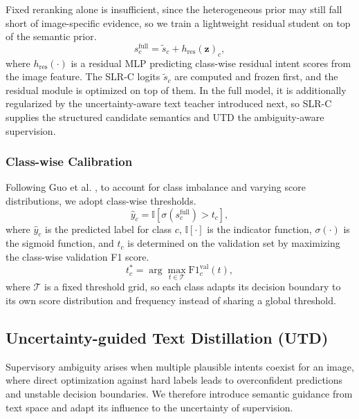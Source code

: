 Fixed reranking alone is insufficient, since the heterogeneous prior may still fall short of image-specific evidence, so we train a lightweight residual student on top of the semantic prior.
\begin{equation}
s^{\text{full}}_c = \tilde{s}_c + h_{\text{res}}(\mathbf{z})_c,
\end{equation}
where $h_{\text{res}}(\cdot)$ is a residual MLP predicting class-wise residual intent scores from the image feature. The SLR-C logits $\tilde{s}_c$ are computed and frozen first, and the residual module is optimized on top of them. In the full model, it is additionally regularized by the uncertainty-aware text teacher introduced next, so SLR-C supplies the structured candidate semantics and UTD the ambiguity-aware supervision.

\subsubsection{Class-wise Calibration}

Following Guo et al. \cite{guo_calibration_2017}, to account for class imbalance and varying score distributions, we adopt class-wise thresholds.
\begin{equation}
\hat{y}_c = \mathbb{I}[\sigma(s^{\text{full}}_c) > t_c],
\end{equation}
where $\hat{y}_c$ is the predicted label for class $c$, $\mathbb{I}[\cdot]$ is the indicator function, $\sigma(\cdot)$ is the sigmoid function, and $t_c$ is determined on the validation set by maximizing the class-wise validation F1 score.
\begin{equation}
t_c^\ast = \arg\max_{t \in \mathcal{T}} \text{F1}_c^{\text{val}}(t),
\end{equation}
where $\mathcal{T}$ is a fixed threshold grid, so each class adapts its decision boundary to its own score distribution and frequency instead of sharing a global threshold.

\subsection{Uncertainty-guided Text Distillation (UTD)}
\label{sec:utd}


Supervisory ambiguity arises when multiple plausible intents coexist for an image, where direct optimization against hard labels leads to overconfident predictions and unstable decision boundaries. We therefore introduce semantic guidance from text space and adapt its influence to the uncertainty of supervision.


